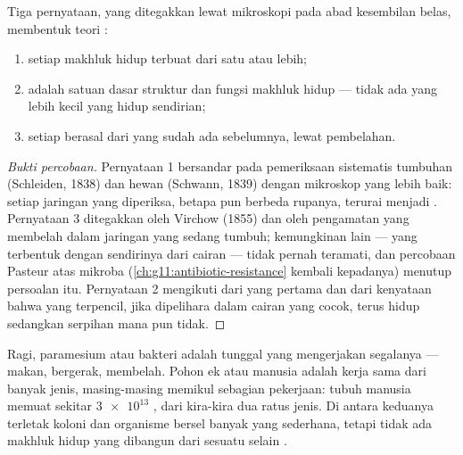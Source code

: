\begin{proposition}\label{prop:g10:cells-common-unit:theory}
Tiga pernyataan, yang ditegakkan lewat mikroskopi pada abad
kesembilan belas, membentuk teori :
\begin{enumerate}
  \item setiap makhluk hidup terbuat dari satu  atau lebih;
  \item {} adalah satuan dasar struktur dan fungsi makhluk
        hidup --- tidak ada yang lebih kecil yang hidup sendirian;
  \item setiap  berasal dari  yang sudah ada sebelumnya, lewat pembelahan.
\end{enumerate}
\end{proposition}
\begin{proof}[Bukti percobaan]
Pernyataan 1 bersandar pada pemeriksaan sistematis tumbuhan (Schleiden,
1838) dan hewan (Schwann, 1839) dengan mikroskop yang lebih baik:
setiap jaringan yang diperiksa, betapa pun berbeda rupanya, terurai
menjadi . Pernyataan 3 ditegakkan oleh Virchow (1855) dan oleh
pengamatan  yang membelah dalam jaringan yang sedang tumbuh;
kemungkinan lain ---  yang terbentuk dengan sendirinya dari cairan
--- tidak pernah teramati, dan percobaan Pasteur atas mikroba
(\cref{ch:g11:antibiotic-resistance} kembali kepadanya) menutup
persoalan itu. Pernyataan 2 mengikuti dari yang pertama dan dari
kenyataan bahwa  yang terpencil, jika dipelihara dalam cairan yang
cocok, terus hidup sedangkan serpihan  mana pun tidak.
\end{proof}

\begin{example}\label{ex:g10:cells-common-unit:onemany}
Ragi, paramesium atau bakteri adalah  tunggal yang mengerjakan
segalanya --- makan, bergerak, membelah. Pohon ek atau manusia adalah
kerja sama  dari banyak jenis, masing-masing memikul sebagian
pekerjaan: tubuh manusia memuat sekitar $\num{3e13}$ , dari kira-kira
dua ratus jenis. Di antara keduanya terletak koloni dan organisme
bersel banyak yang sederhana, tetapi tidak ada makhluk hidup yang
dibangun dari sesuatu selain .
\end{example}

